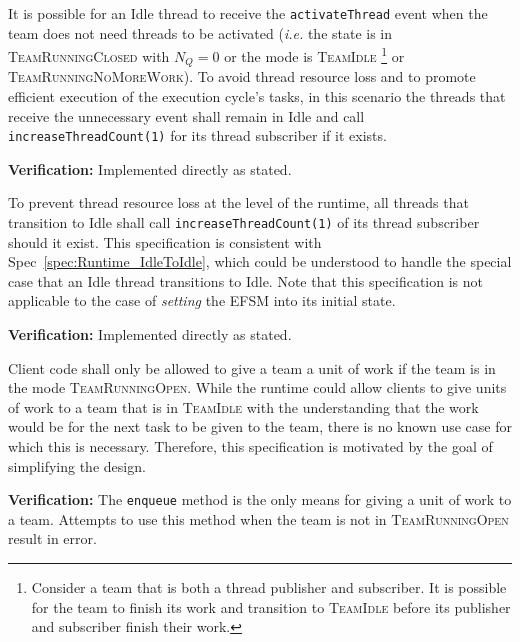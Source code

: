 \documentclass{article}
\newcommand{\TeamIdle}          {\textsc{TeamIdle}}
\newcommand{\TeamRunningOpen}   {\textsc{TeamRunningOpen}}
\newcommand{\TeamRunningClosed} {\textsc{TeamRunningClosed}}
\newcommand{\TeamRunningNoMoreWork} {\textsc{TeamRunningNoMoreWork}}
\begin{document}
\begin{spec}
\label{spec:Runtime_IdleToIdle}
It is possible for an Idle thread to receive the \texttt{activateThread} event
when the team does not need threads to be activated (\textit{i.e.} the state is
in {\TeamRunningClosed} with $N_Q = 0$ or the mode is \TeamIdle
\footnote{Consider a team that is both a thread publisher and subscriber.  It is
possible for the team to finish its work and transition to {\TeamIdle} before
its publisher and subscriber finish their work.} or \TeamRunningNoMoreWork).  To
avoid thread resource loss and to promote efficient execution of the execution
cycle's tasks, in this scenario the threads that receive the unnecessary event
shall remain in Idle and call \texttt{increaseThreadCount(1)} for its thread
subscriber if it exists.
\end{spec}
\textbf{Verification:}\hspace{0.125in} Implemented directly as stated.

\begin{spec}
To prevent thread resource loss at the level of the runtime, all threads that
transition to Idle shall call \texttt{increaseThreadCount(1)} of its thread
subscriber should it exist.  This specification is consistent with
Spec~\ref{spec:Runtime_IdleToIdle}, which could be understood to handle the
special case that an Idle thread transitions to Idle.  Note that this
specification is not applicable to the case of \textit{setting} the EFSM into
its initial state.
\end{spec}
\textbf{Verification:}\hspace{0.125in} Implemented directly as stated.

\begin{spec}
\label{spec:Runtime_NoEnqueue}
Client code shall only be allowed to give a team a unit of work if the team is
in the mode {\TeamRunningOpen}.  While the runtime could allow clients to give
units of work to a team that is in {\TeamIdle} with the understanding that the
work would be for the next task to be given to the team, there is no known use
case for which this is necessary.  Therefore, this specification is motivated by
the goal of simplifying the design.
\end{spec}
\textbf{Verification:}\hspace{0.125in}  The \texttt{enqueue} method is the only
means for giving a unit of work to a team.  Attempts to use this method when the
team is not in {\TeamRunningOpen} result in error.\\
\end{document}
